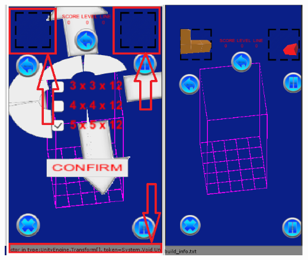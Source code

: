 \documentclass[9pt, b5paper]{article}
\begin{document}
\includegraphics[width=.9\linewidth]{./pic/readme_20221020_195727.png}
\end{document}
